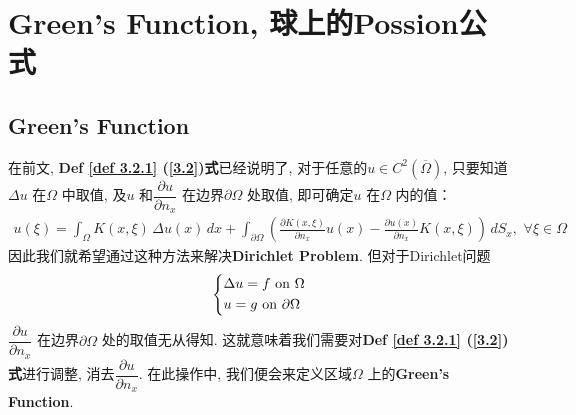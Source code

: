 \newpage

\section{Green's Function, 球上的Possion公式}
\subsection{Green's Function}
	在前文, \textbf{Def \ref{def 3.2.1} (\ref{3.2})式}已经说明了, 对于任意的$u \in C^2(\overline{\Omega})$, 只要知道$\Delta u$ 在$\Omega$ 中取值, 及$u$ 和$\dfrac{\partial u}{\partial n_x}$ 在边界$\partial \Omega$ 处取值, 即可确定$u$ 在$\Omega$ 内的值：
	\begin{align*}
		u(\xi) 
		= \int_{\Omega} K(x , \xi) \, \Delta u(x) \, dx 
		+ \int_{\partial \Omega} \left( \frac{\partial K(x , \xi)}{\partial n_x} u(x) - \frac{\partial u(x)}{\partial n_x} K(x , \xi) \right) \, dS_x , \,\, \forall \xi \in \Omega
	\end{align*}
	因此我们就希望通过这种方法来解决\textbf{Dirichlet Problem}. 但对于Dirichlet问题
	\begin{align*}
		\begin{dcases*}
			\Delta u = f \,\, \text{on} \,\, \Omega \\
			u = g \,\, \text{on} \,\, \partial \Omega
		\end{dcases*}
	\end{align*}
	$\dfrac{\partial u}{\partial n_x}$ 在边界$\partial \Omega$ 处的取值无从得知. 这就意味着我们需要对\textbf{Def \ref{def 3.2.1} (\ref{3.2})式}进行调整, 消去$\dfrac{\partial u}{\partial n_x}$. 在此操作中, 我们便会来定义区域$\Omega$ 上的\textbf{Green's Function}. 
	
	\vspace*{8em}
	
